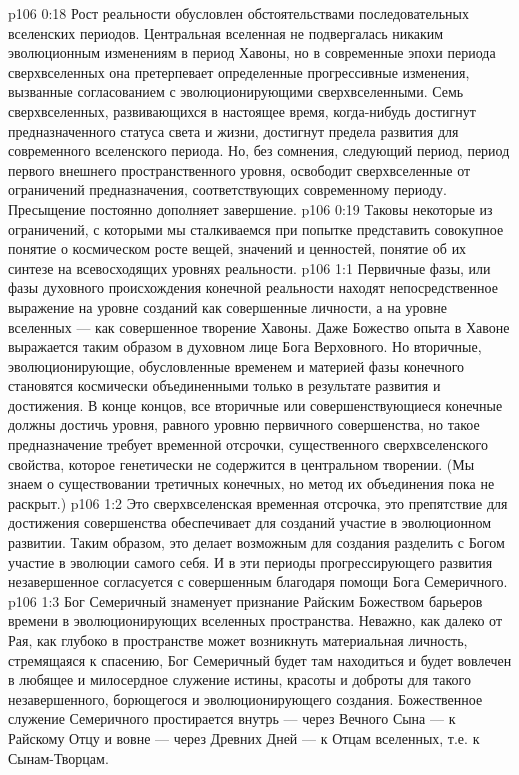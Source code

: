 \vs p106 0:18 \pc Рост реальности обусловлен обстоятельствами последовательных вселенских периодов. Центральная вселенная не подвергалась никаким эволюционным изменениям в период Хавоны, но в современные эпохи периода сверхвселенных она претерпевает определенные прогрессивные изменения, вызванные согласованием с эволюционирующими сверхвселенными. Семь сверхвселенных, развивающихся в настоящее время, когда\hyp{}нибудь достигнут предназначенного статуса света и жизни, достигнут предела развития для современного вселенского периода. Но, без сомнения, следующий период, период первого внешнего пространственного уровня, освободит сверхвселенные от ограничений предназначения, соответствующих современному периоду. Пресыщение постоянно дополняет завершение.
\vs p106 0:19 \pc Таковы некоторые из ограничений, с которыми мы сталкиваемся при попытке представить совокупное понятие о космическом росте вещей, значений и ценностей, понятие об их синтезе на всевосходящих уровнях реальности.
\vs p106 1:1 Первичные фазы, или фазы духовного происхождения конечной реальности находят непосредственное выражение на уровне созданий как совершенные личности, а на уровне вселенных --- как совершенное творение Хавоны. Даже Божество опыта в Хавоне выражается таким образом в духовном лице Бога Верховного. Но вторичные, эволюционирующие, обусловленные временем и материей фазы конечного становятся космически объединенными только в результате развития и достижения. В конце концов, все вторичные или совершенствующиеся конечные должны достичь уровня, равного уровню первичного совершенства, но такое предназначение требует временной отсрочки, существенного сверхвселенского свойства, которое генетически не содержится в центральном творении. (Мы знаем о существовании третичных конечных, но метод их объединения пока не раскрыт.)
\vs p106 1:2 Это сверхвселенская временная отсрочка, это препятствие для достижения совершенства обеспечивает для созданий участие в эволюционном развитии. Таким образом, это делает возможным для создания разделить с Богом участие в эволюции самого себя. И в эти периоды прогрессирующего развития незавершенное согласуется с совершенным благодаря помощи Бога Семеричного.
\vs p106 1:3 Бог Семеричный знаменует признание Райским Божеством барьеров времени в эволюционирующих вселенных пространства. Неважно, как далеко от Рая, как глубоко в пространстве может возникнуть материальная личность, стремящаяся к спасению, Бог Семеричный будет там находиться и будет вовлечен в любящее и милосердное служение истины, красоты и доброты для такого незавершенного, борющегося и эволюционирующего создания. Божественное служение Семеричного простирается внутрь --- через Вечного Сына --- к Райскому Отцу и вовне --- через Древних Дней --- к Отцам вселенных, т.е. к Сынам\hyp{}Творцам.
